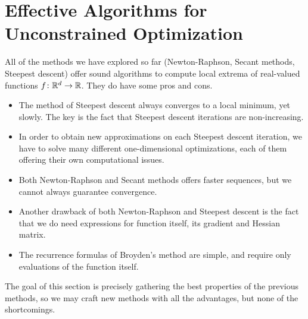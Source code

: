 
\section{Effective Algorithms for Unconstrained Optimization}
All of the methods we have explored so far (Newton-Raphson, Secant methods, Steepest descent) offer sound algorithms to compute local extrema of real-valued functions $f \colon \mathbb{R}^d \to \mathbb{R}$. They do have some pros and cons.  
\begin{itemize}
	\item The method of Steepest descent always converges to a local minimum, yet slowly.  The key is the fact that Steepest descent iterations are non-increasing.
	\item In order to obtain new approximations on each Steepest descent iteration, we have to solve many different one-dimensional optimizations, each of them offering their own computational issues. 
	\item Both Newton-Raphson and Secant methods offers faster sequences, but we cannot always guarantee convergence.  
	\item Another drawback of both Newton-Raphson and Steepest descent is the fact that we do need expressions for function itself, its gradient and Hessian matrix.  
	\item The recurrence formulas of Broyden's method are simple, and require only evaluations of the function itself.
\end{itemize}

The goal of this section is precisely gathering the best properties of the previous methods, so we may craft new methods with all the advantages, but none of the shortcomings.  

\separator

